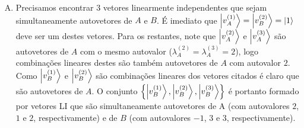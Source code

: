 \documentclass[a4paper, 12pt, notitlepage]{article}
\begin{document}
\begin{enumerate}
\begin{enumerate}[(A)]
  \item Precisamos encontrar $3$ vetores linearmente independentes que sejam simultaneamente autovetores de $A$ e $B$. É imediato que $\ket{v_A^{(1)}} = \ket{v_B^{(2)}} = \ket{1}$ deve ser um destes vetores. Para os restantes, note que $\ket{v_A^{(2)}}$ e $\ket{v_A^{(3)}}$ são autovetores de $A$ com o mesmo autovalor ($\lambda_A^{(2)} = \lambda_A^{(3)} = 2$), logo combinações lineares destes são também autovetores de $A$ com autovalor $2$. Como $\ket{v_B^{(1)}}$ e $\ket{v_B^{(2)}}$ são combinações lineares dos vetores citados é claro que são autovetores de $A$. O conjunto $\left\{\ket{v_B^{(1)}}, \ket{v_B^{(2)}}, \ket{v_B^{(3)}}\right\}$ é portanto formado por vetores LI que são simultaneamente autovetores de A (com autovalores $2$, $1$ e $2$, respectivamente) e de $B$ (com autovalores $-1$, $3$ e $3$, respectivamente).
  

\end{enumerate}
\end{enumerate}
\end{document}
